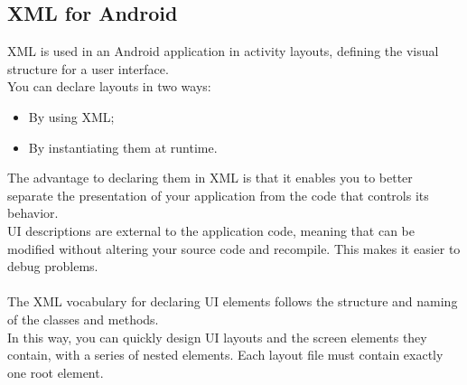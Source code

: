 \subsection{XML for Android}
\label{subsect:XML for Android}
XML is used in an Android application in activity layouts, defining the visual structure for a user interface. \\
You can declare layouts in two ways:
\begin{itemize}
\item By using XML;
\item By instantiating them at runtime.
\end{itemize}
The advantage to declaring them in XML is that it enables you to better separate the presentation of your application from the code that controls its behavior. \\
UI descriptions are external to the application code, meaning that can be modified without altering your source code and recompile. This makes it easier to debug problems. \\\\
The XML vocabulary for declaring UI elements follows the structure and naming of the classes and methods.\\
In this way, you can quickly design UI layouts and the screen elements they contain, with a series of nested elements. Each layout file must contain exactly one root element.

